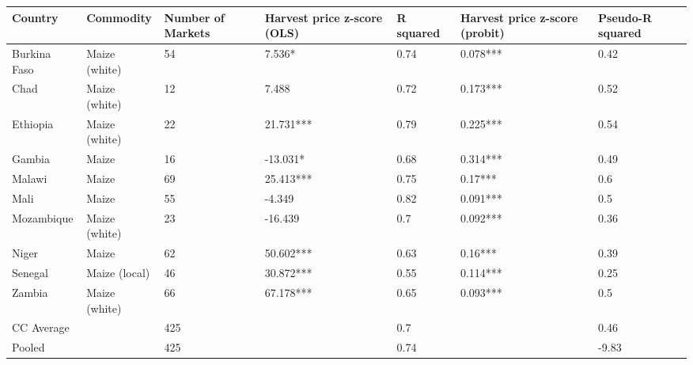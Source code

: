 \begin{table}[ht]
\centering
\begin{tabular}{lllllll}
  \hline
Country & Commodity & Number of Markets & Harvest price z-score (OLS) & R squared & Harvest price z-score (probit) & Pseudo-R squared \\ 
  \hline
Burkina Faso & Maize (white) & 54 & 7.536*  & 0.74 & 0.078*** & 0.42 \\ 
  Chad & Maize (white) & 12 & 7.488  & 0.72 & 0.173*** & 0.52 \\ 
  Ethiopia & Maize (white) & 22 & 21.731*** & 0.79 & 0.225*** & 0.54 \\ 
  Gambia & Maize & 16 & -13.031*  & 0.68 & 0.314*** & 0.49 \\ 
  Malawi & Maize & 69 & 25.413*** & 0.75 & 0.17*** & 0.6 \\ 
  Mali & Maize & 55 & -4.349  & 0.82 & 0.091*** & 0.5 \\ 
  Mozambique & Maize (white) & 23 & -16.439  & 0.7 & 0.092*** & 0.36 \\ 
  Niger & Maize & 62 & 50.602*** & 0.63 & 0.16*** & 0.39 \\ 
  Senegal & Maize (local) & 46 & 30.872*** & 0.55 & 0.114*** & 0.25 \\ 
  Zambia & Maize (white) & 66 & 67.178*** & 0.65 & 0.093*** & 0.5 \\ 
  CC Average &  & 425 &  & 0.7 &  & 0.46 \\ 
  Pooled &  & 425 &  & 0.74 &  & -9.83 \\ 
   \hline
\end{tabular}
\end{table}
